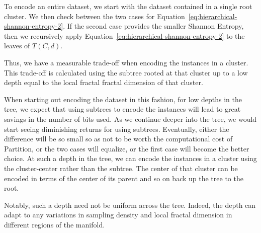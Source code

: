 To encode an entire dataset, we start with the dataset contained in a single root cluster.
We then check between the two cases for Equation~\ref{eq:hierarchical-shannon-entropy-2}.
If the second case provides the smaller Shannon Entropy, then we recursively apply Equation~\ref{eq:hierarchical-shannon-entropy-2} to the leaves of $T(C,d)$.

Thus, we have a measurable trade-off when encoding the instances in a cluster.
This trade-off is calculated using the subtree rooted at that cluster up to a low depth equal to the local fractal fractal dimension of that cluster.

When starting out encoding the dataset in this fashion, for low depths in the tree, we expect that using subtrees to encode the instances will lead to great savings in the number of bits used.
As we continue deeper into the tree, we would start seeing diminishing returns for using subtrees.
Eventually, either 
the difference will be so small so as not to be worth the computational cost of Partition, 
or the two cases will equalize, 
or the first case will become the better choice.
At such a depth in the tree, we can encode the instances in a cluster using the cluster-center rather than the subtree.
The center of that cluster can be encoded in terms of the center of its parent and so on back up the tree to the root.

Notably, such a depth need not be uniform across the tree.
Indeed, the depth can adapt to any variations in sampling density and local fractal dimension in different regions of the manifold.
